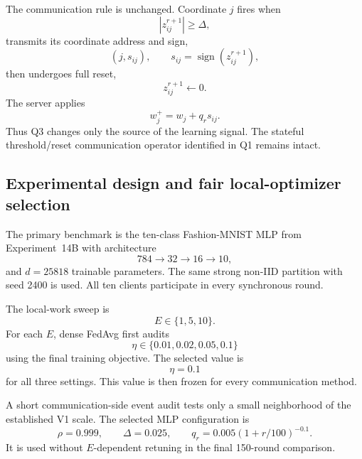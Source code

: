 The communication rule is unchanged. Coordinate $j$ fires when
\begin{equation}
    |z_{ij}^{r+1}|\geq\Delta,
\end{equation}
transmits its coordinate address and sign,
\begin{equation}
    (j,s_{ij}),\qquad s_{ij}=\operatorname{sign}(z_{ij}^{r+1}),
\end{equation}
then undergoes full reset,
\begin{equation}
    z_{ij}^{r+1}\leftarrow0.
\end{equation}
The server applies
\begin{equation}
    w_j^+=w_j+q_r s_{ij}.
\end{equation}
Thus Q3 changes only the source of the learning signal. The stateful threshold/reset communication operator identified in Q1 remains intact.

\subsection{Experimental design and fair local-optimizer selection}

The primary benchmark is the ten-class Fashion-MNIST MLP from Experiment~14B with architecture
\begin{equation}
    784\rightarrow32\rightarrow16\rightarrow10,
\end{equation}
and $d=25818$ trainable parameters. The same strong non-IID partition with seed 2400 is used. All ten clients participate in every synchronous round.

The local-work sweep is
\begin{equation}
    E\in\{1,5,10\}.
\end{equation}
For each $E$, dense FedAvg first audits
\begin{equation}
    \eta\in\{0.01,0.02,0.05,0.1\}
\end{equation}
using the final training objective. The selected value is
\begin{equation}
    \boxed{\eta=0.1}
\end{equation}
for all three settings. This value is then frozen for every communication method.

A short communication-side event audit tests only a small neighborhood of the established V1 scale. The selected MLP configuration is
\begin{equation}
    \rho=0.999,
    \qquad
    \Delta=0.025,
    \qquad
    q_r=0.005(1+r/100)^{-0.1}.
    \label{eq:q3-selected-v1}
\end{equation}
It is used without $E$-dependent retuning in the final 150-round comparison.

